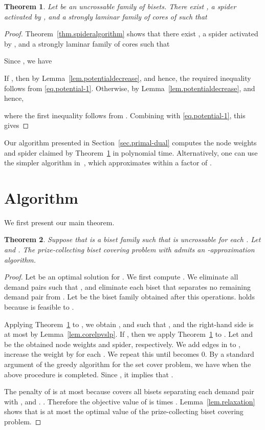 \documentclass[11pt]{article}
\newtheorem{theorem}{Theorem}
\begin{document}
\begin{theorem}\label{thm.potential-spider}
 Let  be an uncrossable family of bisets.
 There exist ,
 a spider  activated by ,
 and a strongly laminar family  of cores of 
 such that 
 
\end{theorem}
\begin{proof}
 Theorem~\ref{thm.spideralgorithm} shows that
 there exist , 
 a spider  activated by , and a strongly laminar family  of cores
 such that
 
 Since , we have



 If , then  by
 Lemma~\ref{lem.potentialdecrease}, and hence, the required inequality
 follows from \eqref{eq.potential-1}.
 Otherwise,
  by
 Lemma~\ref{lem.potentialdecrease}, and hence,

 where the first inequality follows from .
Combining with \eqref{eq.potential-1}, this gives

\end{proof}

Our algorithm presented in Section~\ref{sec.primal-dual}
computes the node weights  and spider  claimed by
Theorem~\ref{thm.potential-spider} in polynomial time. 
Alternatively, one can use the 
simpler algorithm in~\cite{Nutov13activation}, which approximates 
within a factor of .


\section{Algorithm}
\label{sec.algorithm}

We first present our main theorem.

\begin{theorem}\label{thm.main}
 Suppose that  is a biset family such that  is
 uncrossable for each .
 Let 
 and .
 The prize-collecting biset covering problem with  admits an -approximation algorithm.
\end{theorem}
\begin{proof}
 Let  be an optimal solution for .
 We first compute .
 We eliminate all demand pairs  such that ,
 and eliminate each biset that separates no remaining demand pair from .
 Let  be the biset family obtained after this operations.
  holds
 because  is feasible to .

 Applying Theorem~\ref{thm.potential-spider} to ,
 we obtain ,  and  
 such that
 ,
and the right-hand side is at most 
 by Lemma~\ref{lem.corelpvslp}.
 If , then
 we apply
 Theorem~\ref{thm.potential-spider} to .
 Let  and  be the obtained node weights and spider, respectively.
 We add edges in  to ,
 increase the weight  by  for each .
 We repeat this until  becomes 0.
 By a standard argument of the greedy algorithm for the set cover problem,
 we have 
 when the above procedure is completed.
 Since ,
 it implies that .

The penalty of  is at most 
 because  covers all bisets separating each demand pair 
 with , and .
 .
 Therefore the objective value of  is 
 times .
 Lemma~\ref{lem.relaxation} shows that  is at most the
 optimal value of the prize-collecting biset covering problem.
\end{proof}
\end{document}
